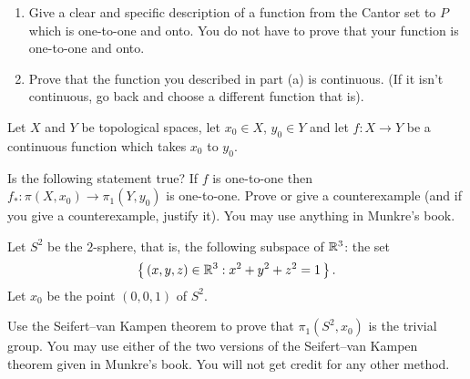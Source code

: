 \begin{problem}
  \hfil
  \begin{enumerate}[label=(\alph*),noitemsep]
  \item Give a clear and specific description of a function from the Cantor
    set to $P$ which is one-to-one and onto. You do not have to prove that
    your function is one-to-one and onto.
  \item Prove that the function you described in part (a) is
    continuous. (If it isn't continuous, go back and choose a different
    function that is).
  \end{enumerate}
\end{problem}
\begin{solution}
\end{solution}

\begin{problem}
  Let $X$ and $Y$ be topological spaces, let $x_0\in X$, $y_0\in Y$ and let
  $f\colon X\to Y$ be a continuous function which takes $x_0$ to $y_0$.

  Is the following statement true? If $f$ is one-to-one then
  $f_*\colon\pi(X,x_0)\to \pi_1(Y,y_0)$ is one-to-one. Prove or give a
  counterexample (and if you give a counterexample, justify it). You may
  use anything in Munkre's book.
\end{problem}
\begin{solution}
\end{solution}

\begin{problem}
  Let $S^2$ be the $2$-sphere, that is, the following subspace of $\mathbb{R}^3$:
  the set
  \[
    \left\{\,(x,y,z)\in\mathbb{R}^3:x^2+y^2+z^2=1\,\right\}.
  \]
  Let $x_0$ be the point $(0,0,1)$ of $S^2$.


  Use the Seifert--van Kampen theorem to prove that $\pi_1(S^2,x_0)$ is the
  trivial group. You may use either of the two versions of the Seifert--van
  Kampen theorem given in Munkre's book. You will not get credit for any
  other method.
\end{problem}

\begin{solution}
\end{solution}

